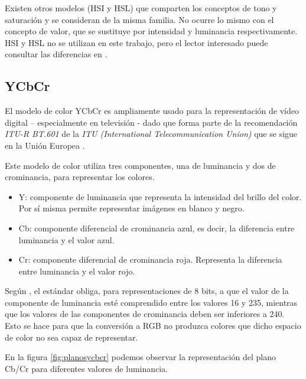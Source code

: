 Existen otros modelos (HSI y HSL) que comparten los conceptos de tono y saturación y se consideran de la misma familia. No ocurre lo mismo con el concepto de valor, que se sustituye por intensidad y luminancia respectivamente. HSI y HSL no se utilizan en este trabajo, pero el lector interesado puede consultar las diferencias en \cite{abitofallcolorspaces}.

\subsection{YCbCr}

El modelo de color YCbCr es ampliamente usado para la representación de vídeo digital – especialmente en televisión - dado que forma parte de la recomendación \textit{ITU-R BT.601} de la \textit{ITU (International Telecommunication Union)} que se sigue en la Unión Europea \cite{abitofallcolorspaces}. 

Este modelo de color utiliza tres componentes, una de luminancia y dos de crominancia, para representar los colores.

\begin{itemize}
    \item Y: componente de luminancia que representa la intensidad del brillo del color. Por sí misma permite representar imágenes en blanco y negro.
    \item Cb: componente diferencial de crominancia azul, es decir, la diferencia entre luminancia y el valor azul.
    \item Cr: componente diferencial de crominancia roja. Representa la diferencia entre luminancia y el valor rojo. 
\end{itemize}

Según \cite{featureextraction}, el estándar obliga, para representaciones de 8 bits, a que el valor de la componente de luminancia esté comprendido entre los valores 16 y 235, mientras que los valores de las componentes de crominancia deben ser inferiores a 240. Esto se hace para que la conversión a RGB no produzca colores que dicho espacio de color no sea capaz de representar.

En la figura \ref{fig:planosycbcr} podemos observar la representación del plano Cb/Cr para diferentes valores de luminancia.

